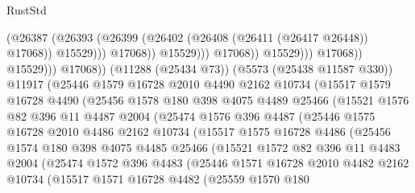 \begin{lexlean}{RustStd}
\begin{coremodule}
                                          (@26387
                                            (@26393
                                              (@26399
                                                (@26402 (@26408 (@26411 (@26417 @26448)) @17068))
                                                @15529)))
                                          @17068))
                                      @15529)))
                                @17068))
                            @15529)))
                      @17068))
                  @15529)))
            @17068))
        (@11288 (@25434 @73))
        (@5573 (@25438 @11587 @330))
        @11917
        (@25446
          @1579
          @16728
          @2010
          @4490
          @2162
          @10734
          (@15517
            @1579
            @16728
            @4490
            (@25456
              @1578
              @180
              @398
              @4075
              @4489
              @25466
              (@15521
                @1576
                @82
                @396
                @11
                @4487
                @2004
                (@25474
                  @1576
                  @396
                  @4487
                  (@25446
                    @1575
                    @16728
                    @2010
                    @4486
                    @2162
                    @10734
                    (@15517
                      @1575
                      @16728
                      @4486
                      (@25456
                        @1574
                        @180
                        @398
                        @4075
                        @4485
                        @25466
                        (@15521
                          @1572
                          @82
                          @396
                          @11
                          @4483
                          @2004
                          (@25474
                            @1572
                            @396
                            @4483
                            (@25446
                              @1571
                              @16728
                              @2010
                              @4482
                              @2162
                              @10734
                              (@15517
                                @1571
                                @16728
                                @4482
                                (@25559
                                  @1570
                                  @180

\end{coremodule}
\end{lexlean}
